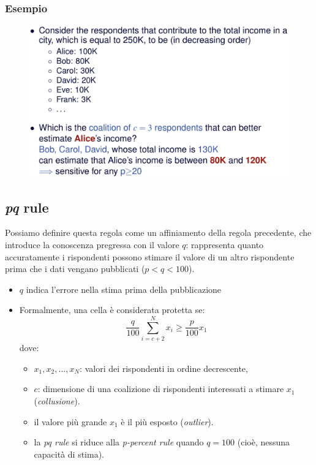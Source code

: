 \documentclass{report}
\begin{document}
\subsubsection{Esempio}
\begin{figure}[ht]
    \centering
    \includegraphics[width=1\linewidth]{images/p-perc.png}
\end{figure}

\subsection{\textit{pq} rule}
Possiamo definire questa regola come un affiniamento della regola precedente, che introduce 
la conoscenza pregressa con il valore $q$: rappresenta quanto accuratamente i rispondenti 
possono stimare il valore di un altro rispondente prima che i dati vengano pubblicati ($p<q<100$).

\begin{itemize}
    \item $q$ indica l'errore nella stima prima della pubblicazione 
    \item Formalmente, una cella è considerata protetta se:
    \[
    \frac{q}{100} \sum_{i=c+2}^{N} x_i \geq \frac{p}{100} x_1
    \]
    dove:
    \begin{itemize}
        \item \( x_1, x_2, \ldots, x_N \): valori dei rispondenti in ordine decrescente,
        \item \( c \): dimensione di una coalizione di rispondenti interessati a stimare \( x_1 \) (\textit{collusione}).
        \item il valore più grande \( x_1 \) è il più esposto (\textit{outlier}).
        \item la \textit{pq rule} si riduce alla \textit{p-percent rule} quando \( q = 100 \) (cioè, nessuna capacità di stima).
    \end{itemize}
\end{itemize}
\end{document}
